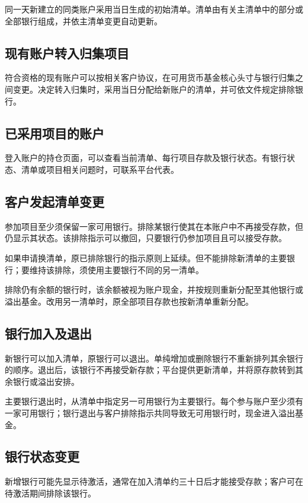 \documentclass[UTF8,fontset=none,11pt,a4paper]{ctexart}
\begin{document}
同一天新建立的同类账户采用当日生成的初始清单。清单由有关主清单中的部分或全部银行组成，并依主清单变更\allowbreak\mbox{自动更新。}


\subsection*{现有账户转入归集项目}
符合资格的现有账户可以按相关客户协议，在可用货币基金核心头寸与银行归集之间变更。决定转入归集时，采用当日分配给新账户的清单，并可依文件规定\allowbreak\mbox{排除银行。}


\subsection*{已采用项目的账户}
登入账户的持仓页面，可以查看当前清单、每行项目存款及银行状态。有银行状态、清单或项目相关问题时，可联系\allowbreak\mbox{平台代表。}


\subsection*{客户发起清单变更}
参加项目至少须保留一家可用银行。排除某银行使其在本账户中不再接受存款，但仍显示其状态。该排除指示可以撤回，只要银行仍参加项目且可以\allowbreak\mbox{接受存款。}


如果申请换清单，原已排除银行的指示原则上延续。但不能排除新清单的主要银行；要维持该排除，须使用主要银行不同的\allowbreak\mbox{另一清单。}


排除仍有余额的银行时，该余额被视为账户现金，并按规则重新分配至其他银行或溢出基金。改用另一清单时，原全部项目存款也按新清单\allowbreak\mbox{重新分配。}


\subsection*{银行加入及退出}
新银行可以加入清单，原银行可以退出。单纯增加或删除银行不重新排列其余银行的顺序。退出后，该银行不再接受新存款；平台提供更新清单，并将原存款转到其余银行或\allowbreak\mbox{溢出安排。}


主要银行退出时，从清单中指定另一可用银行为主要银行。每个参与账户至少须有一家可用银行；银行退出与客户排除指示共同导致无可用银行时，现金进入\allowbreak\mbox{溢出基金。}


\subsection*{银行状态变更}
新增银行可能先显示待激活，通常在加入清单约三十日后才能接受存款；客户可在待激活期间排\allowbreak\mbox{除该银行。}
\end{document}
